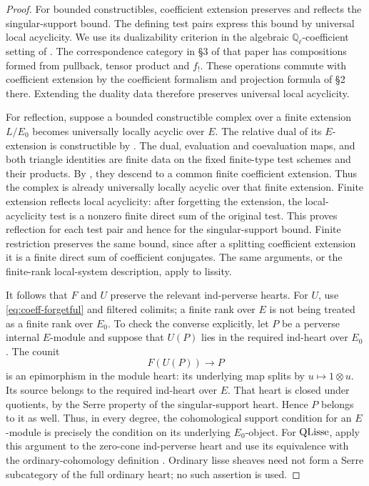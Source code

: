 \begin{proof}
For bounded constructibles, coefficient extension preserves and reflects
the singular-support bound. The defining test pairs express this bound
by universal local acyclicity. We use its dualizability criterion in
the algebraic $\mathbb Q_\ell$-coefficient setting of
\cite[Theorem~1.6]{HansenScholze}. The correspondence category in
\S3 of that paper has compositions formed from pullback, tensor
product and $f_!$. These operations commute with coefficient extension
by the coefficient formalism and projection formula of \S2 there.
Extending the duality data therefore preserves universal local
acyclicity.

For reflection, suppose a bounded constructible complex over a finite
extension $L/E_0$ becomes universally locally acyclic over $E$.
The relative dual of its $E$-extension is constructible by
\cite[Proposition~3.4(ii)]{HansenScholze}.
The dual, evaluation and coevaluation maps, and both triangle
identities are finite data on the fixed finite-type test schemes and
their products. By \cite[Lemma~7.9]{HemoRicharzScholbach}, they descend
to a common finite coefficient extension. Thus the complex is already
universally locally acyclic over that finite extension. Finite
extension reflects local acyclicity: after forgetting the extension,
the local-acyclicity test is a nonzero finite direct sum of the
original test. This proves reflection for each test pair and hence
for the singular-support bound. Finite restriction preserves the
same bound, since after a splitting coefficient extension it is a
finite direct sum of coefficient conjugates. The same arguments, or
the finite-rank local-system description, apply to lissity.

It follows that $F$ and $U$ preserve the relevant ind-perverse hearts.
For $U$, use \eqref{eq:coeff-forgetful} and filtered colimits; a finite
rank over $E$ is not being treated as a finite rank over $E_0$.
To check the converse explicitly, let $P$ be a perverse internal
$E$-module and suppose that $U(P)$ lies in the required ind-heart over
$E_0$. The counit
\[
 F(U(P))\longrightarrow P
\]
is an epimorphism in the module heart: its underlying map splits by
$u\mapsto1\otimes u$. Its source belongs to the required ind-heart
over $E$. That heart is closed under quotients, by the Serre property
of the singular-support heart. Hence $P$ belongs to it as well.
Thus, in every degree, the cohomological support condition for an
$E$-module is precisely the condition on its underlying $E_0$-object.
For $\operatorname{QLisse}$, apply this argument to the zero-cone ind-perverse
heart and use its equivalence with the ordinary-cohomology definition
\cite[\S1.2.9]{AGKRRV}. Ordinary lisse sheaves need not form a
Serre subcategory of the full ordinary heart; no such assertion is
used.


\end{proof}
